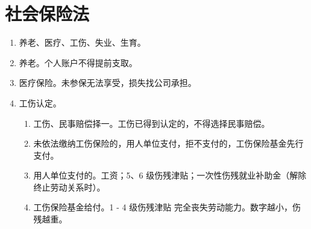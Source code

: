 \section{社会保险法}
\begin{enumerate}
  \item 养老、医疗、工伤、失业、生育。
  \item 养老。个人账户不得提前支取。
  \item 医疗保险。未参保无法享受，损失找公司承担。
  \item 工伤认定。
        \begin{enumerate}
          \item 工伤、民事赔偿择一。工伤已得到认定的，不得选择民事赔偿。
          \item 未依法缴纳工伤保险的，用人单位支付，拒不支付的，工伤保险基金先行支付。
          \item 用人单位支付的。工资；5、6 级伤残津贴；一次性伤残就业补助金（解除 \hz 终止劳动关系时）。
          \item 工伤保险基金给付。1 - 4 级伤残津贴 \yjt 完全丧失劳动能力。数字越小，伤残越重。
        \end{enumerate}
\end{enumerate}
